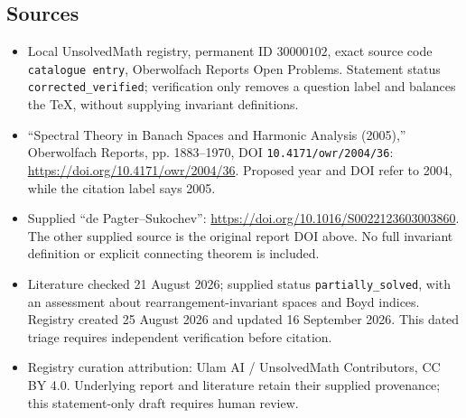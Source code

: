 \documentclass[11pt]{article}
\begin{document}
\subsection{Sources}
\begin{itemize}
\item Local UnsolvedMath registry, permanent ID \(30000102\), exact source code \texttt{catalogue entry}, Oberwolfach Reports Open Problems. Statement status \texttt{corrected\_verified}; verification only removes a question label and balances the TeX, without supplying invariant definitions.
\item ``Spectral Theory in Banach Spaces and Harmonic Analysis (2005),'' Oberwolfach Reports, pp. 1883--1970, DOI \texttt{10.4171/owr/2004/36}: \url{https://doi.org/10.4171/owr/2004/36}. Proposed year and DOI refer to 2004, while the citation label says 2005.
\item Supplied ``de Pagter--Sukochev'': \url{https://doi.org/10.1016/S0022123603003860}. The other supplied source is the original report DOI above. No full invariant definition or explicit connecting theorem is included.
\item Literature checked 21 August 2026; supplied status \texttt{partially\_solved}, with an assessment about rearrangement-invariant spaces and Boyd indices. Registry created 25 August 2026 and updated 16 September 2026. This dated triage requires independent verification before citation.
\item Registry curation attribution: Ulam AI / UnsolvedMath Contributors, CC BY 4.0. Underlying report and literature retain their supplied provenance; this statement-only draft requires human review.
\end{itemize}
\end{document}

